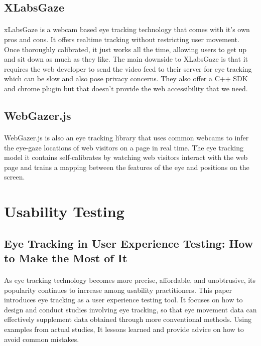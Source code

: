 \documentclass[12pt,a4paper,final]{extreport}
\begin{document}
\subsection{XLabsGaze}
\paragraph{}
xLabsGaze is a webcam based eye tracking technology that comes with it's own pros and cons. It offers realtime tracking without restricting user movement. Once thoroughly calibrated, it just works all the time, allowing users to get up and sit down as much as they like. The main downside to XLabsGaze is that it requires the web developer to send the video feed to their server for eye tracking which can be slow and also pose privacy concerns. They also offer a C++ SDK and chrome plugin but that doesn't provide the web accessibility that we need.
\subsection{WebGazer.js}
\paragraph{}
WebGazer.js is also an eye tracking library that uses common webcams to infer the eye-gaze locations of web visitors on a page in real time. The eye tracking model it contains self-calibrates by watching web visitors interact with the web page and trains a mapping between the features of the eye and positions on the screen.

\section{Usability Testing}
\subsection{Eye Tracking in User Experience Testing: How to Make the Most of It}
\paragraph{}
As eye tracking technology becomes more precise, affordable, and unobtrusive, its popularity continues to increase among usability practitioners. This paper introduces eye tracking as a user experience testing tool. It focuses on how to design and conduct studies involving eye tracking, so that eye movement data can effectively supplement data obtained through more conventional methods. Using examples from actual studies, It lessons learned and provide advice on how to avoid common mistakes.
\end{document}
